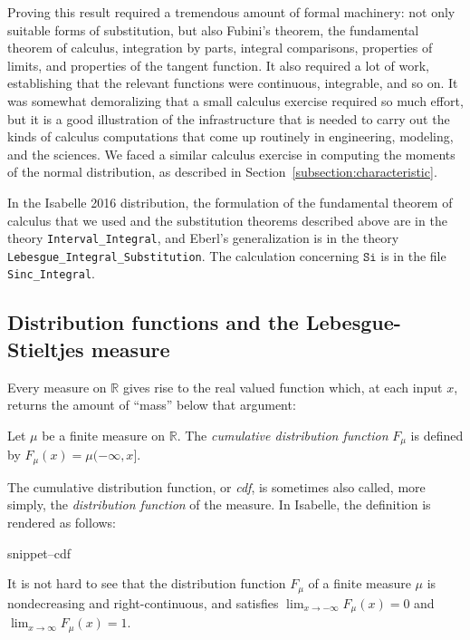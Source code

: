 \documentclass{svjour3}
\newcommand{\RR}{\mathbb{R}}
\newcommand{\fn}[1]{\mathtt{#1}} %
\newcommand{\Snippet}[1]{\csname snippet--#1\endcsname}
\begin{document}
Proving this result required a tremendous amount of formal machinery: not only suitable forms of substitution, but also Fubini's theorem, the fundamental theorem of calculus, integration by parts, integral comparisons, properties of limits, and properties of the tangent function. It also required a lot of work, establishing that the relevant functions were continuous, integrable, and so on. It was somewhat demoralizing that a small calculus exercise required so much effort, but it is a good illustration of the infrastructure that is needed to carry out the kinds of calculus computations that come up routinely in engineering, modeling, and the sciences. We faced a similar calculus exercise in computing the moments of the normal distribution, as described in Section~\ref{subsection:characteristic}.

In the Isabelle 2016 distribution, the formulation of the fundamental theorem of calculus that we used and the substitution theorems described above are in the theory \verb=Interval_Integral=, and Eberl's generalization is in the theory \verb=Lebesgue_Integral_Substitution=. The calculation concerning $\fn{Si}$ is in the file \verb=Sinc_Integral=.

\subsection{Distribution functions and the Lebesgue-Stieltjes measure}
\label{subsection:distribution:functions}

Every measure on $\RR$ gives rise to the real valued function which, at each input $x$, returns the amount of ``mass'' below that argument:

\begin{definition}
Let $\mu$ be a finite measure on $\RR$. The \emph{cumulative distribution function} $F_\mu$ is defined by $F_\mu(x) = \mu (-\infty, x]$.
\end{definition}
The cumulative distribution function, or \emph{cdf}, is sometimes also called, more simply, the \emph{distribution function} of the measure. In Isabelle, the definition is rendered as follows:

\Snippet{cdf}

It is not hard to see that the distribution function $F_\mu$ of a finite measure $\mu$ is nondecreasing and right-continuous, and satisfies $\lim_{x \rightarrow -\infty} F_\mu(x) = 0$ and \linebreak $\lim_{x \rightarrow \infty} F_\mu(x) = 1$.
\end{document}
